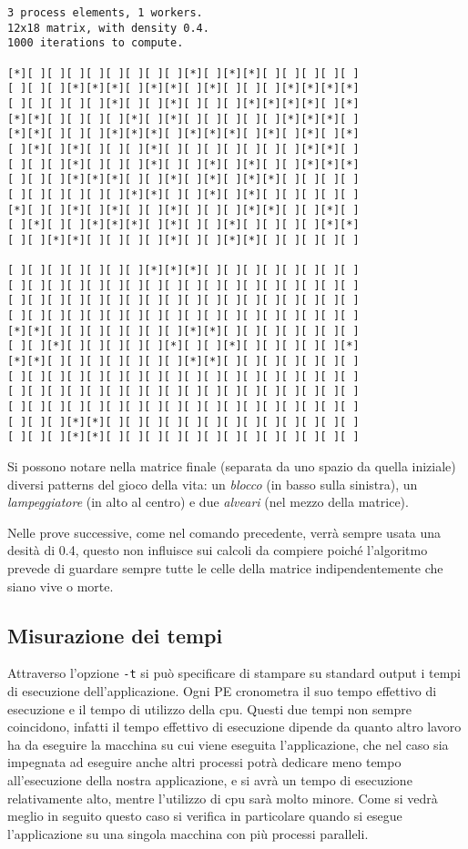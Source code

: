 \begin{verbatim}
3 process elements, 1 workers.
12x18 matrix, with density 0.4.
1000 iterations to compute.

[*][ ][ ][ ][ ][ ][ ][ ][ ][*][ ][*][*][ ][ ][ ][ ][ ]
[ ][ ][ ][*][*][*][ ][*][*][ ][*][ ][ ][ ][*][*][*][*]
[ ][ ][ ][ ][ ][*][ ][ ][*][ ][ ][ ][*][*][*][*][ ][*]
[*][*][ ][ ][ ][ ][*][ ][*][ ][ ][ ][ ][ ][*][*][*][ ]
[*][*][ ][ ][ ][*][*][*][ ][*][*][*][ ][*][ ][*][ ][*]
[ ][*][ ][*][ ][ ][ ][*][ ][ ][ ][ ][ ][ ][ ][*][*][ ]
[ ][ ][ ][*][ ][ ][ ][*][ ][ ][*][ ][*][ ][ ][*][*][*]
[ ][ ][ ][*][*][*][ ][ ][*][ ][*][ ][*][*][ ][ ][ ][ ]
[ ][ ][ ][ ][ ][ ][*][*][ ][ ][*][ ][*][ ][ ][ ][ ][ ]
[*][ ][ ][*][ ][*][ ][ ][*][ ][ ][ ][*][*][ ][ ][*][ ]
[ ][*][ ][ ][*][*][*][ ][*][ ][ ][*][ ][ ][ ][ ][*][*]
[ ][ ][*][*][ ][ ][ ][ ][*][ ][ ][*][*][ ][ ][ ][ ][ ]

[ ][ ][ ][ ][ ][ ][ ][*][*][*][ ][ ][ ][ ][ ][ ][ ][ ]
[ ][ ][ ][ ][ ][ ][ ][ ][ ][ ][ ][ ][ ][ ][ ][ ][ ][ ]
[ ][ ][ ][ ][ ][ ][ ][ ][ ][ ][ ][ ][ ][ ][ ][ ][ ][ ]
[ ][ ][ ][ ][ ][ ][ ][ ][ ][ ][ ][ ][ ][ ][ ][ ][ ][ ]
[*][*][ ][ ][ ][ ][ ][ ][ ][*][*][ ][ ][ ][ ][ ][ ][ ]
[ ][ ][*][ ][ ][ ][ ][ ][*][ ][ ][*][ ][ ][ ][ ][ ][*]
[*][*][ ][ ][ ][ ][ ][ ][ ][*][*][ ][ ][ ][ ][ ][ ][ ]
[ ][ ][ ][ ][ ][ ][ ][ ][ ][ ][ ][ ][ ][ ][ ][ ][ ][ ]
[ ][ ][ ][ ][ ][ ][ ][ ][ ][ ][ ][ ][ ][ ][ ][ ][ ][ ]
[ ][ ][ ][ ][ ][ ][ ][ ][ ][ ][ ][ ][ ][ ][ ][ ][ ][ ]
[ ][ ][ ][*][*][ ][ ][ ][ ][ ][ ][ ][ ][ ][ ][ ][ ][ ]
[ ][ ][ ][*][*][ ][ ][ ][ ][ ][ ][ ][ ][ ][ ][ ][ ][ ]
\end{verbatim}
Si possono notare nella matrice finale (separata da uno spazio da quella iniziale) diversi patterns del gioco della vita: un \textit{blocco} (in basso sulla sinistra), un \textit{lampeggiatore} (in alto al centro) e due \textit{alveari} (nel mezzo della matrice).

Nelle prove successive, come nel comando precedente, verr\`a sempre usata una desit\`a di 0.4, questo non influisce sui calcoli da compiere poich\'e l'algoritmo prevede di guardare sempre tutte le celle della matrice indipendentemente che siano vive o morte.

\subsection{Misurazione dei tempi}
Attraverso l'opzione \texttt{-t} si pu\`o specificare di stampare su standard output i tempi di esecuzione dell'applicazione. Ogni PE cronometra il suo tempo effettivo di esecuzione e il tempo di utilizzo della cpu. Questi due tempi non sempre coincidono, infatti il tempo effettivo di esecuzione dipende da quanto altro lavoro ha da eseguire la macchina su cui viene eseguita l'applicazione, che nel caso sia impegnata ad eseguire anche altri processi potr\`a dedicare meno tempo all'esecuzione della nostra applicazione, e si avr\`a un tempo di esecuzione relativamente alto, mentre l'utilizzo di cpu sar\`a molto minore. Come si vedr\`a meglio in seguito questo caso si verifica in particolare quando si esegue l'applicazione su una singola macchina con pi\`u processi paralleli. 

